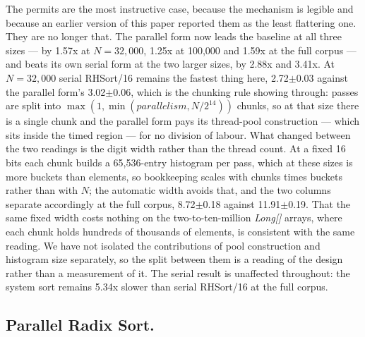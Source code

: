 \documentclass[twoside,leqno,twocolumn]{article}
\begin{document}
The permits are the most instructive case, because the mechanism is legible and because an earlier
version of this paper reported them as the least flattering one.
They are no longer that.
The parallel form now leads the baseline at all three sizes --- by 1.57x at $N=32{,}000$, 1.25x at
100,000 and 1.59x at the full corpus --- and beats its own serial form at the two larger sizes, by
2.88x and 3.41x.
At $N=32{,}000$ serial RHSort/16 remains the fastest thing here, 2.72$\pm$0.03 against the parallel
form's 3.02$\pm$0.06, which is the chunking rule showing through: passes are split into
\mbox{$\max(1, \min(\textit{parallelism}, N / 2^{14}))$} chunks, so at that size there is a single
chunk and the parallel form pays its thread-pool construction --- which sits inside the timed
region --- for no division of labour.
What changed between the two readings is the digit width rather than the thread count.
At a fixed 16 bits each chunk builds a 65,536-entry histogram per pass, which at these sizes is more
buckets than elements, so bookkeeping scales with chunks times buckets rather than with $N$; the
automatic width avoids that, and the two columns separate accordingly at the full corpus, 8.72$\pm$0.18
against 11.91$\pm$0.19.
That the same fixed width costs nothing on the two-to-ten-million \textit{Long[]} arrays, where each
chunk holds hundreds of thousands of elements, is consistent with the same reading.
We have not isolated the contributions of pool construction and histogram size separately, so the
split between them is a reading of the design rather than a measurement of it.
The serial result is unaffected throughout: the system sort remains 5.34x slower than serial RHSort/16
at the full corpus.

\subsection{Parallel Radix Sort.}
\label{sec:parallel-radix}
\end{document}
